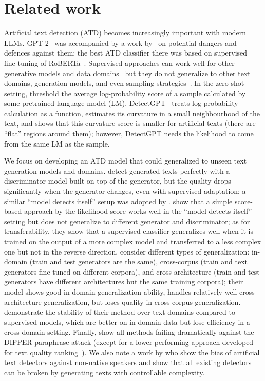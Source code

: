 \documentclass{article}
\begin{document}
\section{Related work}\label{sec:related}

Artificial text detection (ATD) becomes increasingly important with modern LLMs.
GPT-2~\citep{radford2019language} was accompanied by a work by~\citet{solaiman2019release} on potential dangers and defences against them;
the best ATD classifier there was based on supervised fine-tuning of RoBERTa~\citep{liu2019roberta}. Supervised approaches can work well for other generative models and data domains~\citep{krishna2023paraphrasing, guo2023close, he2023mgtbench} but they do not generalize to other text domains, generation models, and even sampling strategies~\citep{bakhtin2019real, solaiman2019release}. In the zero-shot setting, \citet{solaiman2019release}
threshold the average log-probability score of a sample calculated by some pretrained language model (LM). 
DetectGPT~\citep{mitchell2023detectgpt}
treats log-probability calculation as a function, estimates its curvature in a small neighbourhood of the text, and shows that this curvature score is smaller for artificial texts (there are ``flat'' regions around them); however, DetectGPT needs the likelihood to come from the same LM as the sample.


We focus on developing an ATD model that could generalized to unseen text generation models and domains. \citet{zellers2019defending} detect generated texts perfectly with a discriminator model built on top of the generator, but the quality drops significantly when the generator changes, even with supervised adaptation;
a similar ``model detects itself'' setup was adopted by \citet{mitchell2023detectgpt}. \citet{solaiman2019release} show that a simple score-based approach by the likelihood score works well in the ``model detects itself'' setting but does not generalize to different generator and discriminator; as for transferability,
they show that a supervised classifier generalizes well when it is trained on the output of a more complex model and transferred to a less complex one but 
not in the reverse direction. 
\citet{bakhtin2019real} consider different types of generalization: in-domain (train and test generators are the same), cross-corpus (train and text generators fine-tuned on different corpora), and cross-architecture (train and test generators have different architectures but the same training corpora); their model shows good in-domain generalization ability, handles relatively well cross-architecture generalization, but loses quality in cross-corpus generalization.
\citet{mitchell2023detectgpt} demonstrate the stability of their method over text domains compared to supervised models, which are better on in-domain data but lose efficiency in a cross-domain setting. Finally, \citet{krishna2023paraphrasing} show all methods failing dramatically against the DIPPER paraphrase attack (except for a lower-performing approach developed for text quality ranking~\citep{krishna2022rankgen}).
We also note a work by \citet{liang2023gpt} who show the bias of artificial text detectors against non-native speakers and show that all existing detectors can be broken by generating texts with controllable complexity. 
\end{document}
